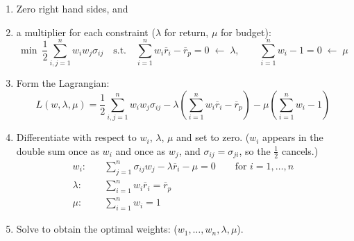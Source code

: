 \begin{enumerate}[label=\textcolor{red!70!black}{\textbf{Step \arabic*:}}, leftmargin=*]
    \item Zero right hand sides, and
    \item a multiplier for each constraint ($\lambda$ for return, $\mu$ for budget):
    \[\min\ \frac{1}{2}\sum_{i,j=1}^{n}w_iw_j\sigma_{ij} \quad \text{s.t.}\quad \sum_{i=1}^{n}w_i\overline{r}_i - \overline{r}_p = 0 \;\longleftarrow\; \lambda, \qquad \sum_{i=1}^{n}w_i - 1 = 0 \;\longleftarrow\; \mu\]
    \setcounter{enumi}{2}
    \item Form the Lagrangian:
    \[L(w,\lambda,\mu) = \frac{1}{2}\sum_{i,j=1}^{n}w_iw_j\sigma_{ij} - \lambda\left(\sum_{i=1}^{n}w_i\overline{r}_i - \overline{r}_p\right) - \mu\left(\sum_{i=1}^{n}w_i - 1\right)\]
    \item Differentiate with respect to $w_i$, $\lambda$, $\mu$ and set to zero. ($w_i$ appears in the double sum once as $w_i$ and once as $w_j$, and $\sigma_{ij} = \sigma_{ji}$, so the $\frac{1}{2}$ cancels.)
    \[\boxed{\begin{aligned}
        w_i:&\quad \sum_{j=1}^{n}\sigma_{ij}w_j - \lambda\overline{r}_i - \mu = 0 \qquad \text{for } i = 1, \dots, n\\
        \lambda:&\quad \sum_{i=1}^{n}w_i\overline{r}_i = \overline{r}_p\\
        \mu:&\quad \sum_{i=1}^{n}w_i = 1
    \end{aligned}}\]
    \item Solve to obtain the optimal weights:  ($w_1, \dots, w_n, \lambda, \mu$).
\end{enumerate}

